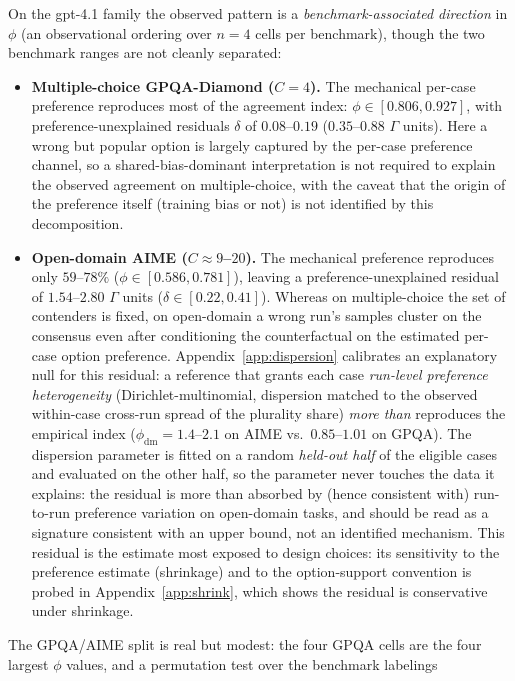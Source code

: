\documentclass{article}
\newcommand{\agreementIndex}{\Gamma}
\begin{document}
On the gpt-4.1 family the observed pattern is a
\emph{benchmark-associated direction} in
$\phi$ (an observational ordering over $n=4$ cells per benchmark),
though the two benchmark ranges are not cleanly separated:
\begin{itemize}
\item \textbf{Multiple-choice GPQA-Diamond ($C=4$).} The mechanical
  per-case preference reproduces most of the agreement index:
  $\phi\in[0.806,0.927]$, with preference-unexplained residuals $\delta$ of
  $0.08$--$0.19$ ($0.35$--$0.88$ $\agreementIndex$ units). Here a wrong but popular
  option is largely captured by the
  per-case preference channel, so a shared-bias-dominant interpretation
  is not required to explain the observed agreement on
  multiple-choice, with the
  caveat that the origin of the preference itself (training bias or not)
  is not identified by this decomposition.
\item \textbf{Open-domain AIME ($C\approx9$--$20$).} The mechanical
  preference reproduces only $59$--$78\%$
  ($\phi\in[0.586,0.781]$), leaving a preference-unexplained residual of
  $1.54$--$2.80$ $\agreementIndex$ units ($\delta\in[0.22,0.41]$). Whereas on
  multiple-choice the set of contenders is fixed, on open-domain
  a wrong run's samples cluster on the consensus even after
  conditioning the counterfactual on the estimated per-case option preference. Appendix~\ref{app:dispersion}
  calibrates an explanatory null for this residual: a reference that grants
  each case \emph{run-level preference heterogeneity}
  (Dirichlet-multinomial, dispersion matched to the observed
  within-case cross-run spread of the plurality share) \emph{more than}
  reproduces the empirical index ($\phi_{\mathrm{dm}}=1.4$--$2.1$ on
  AIME vs.\ $0.85$--$1.01$ on GPQA). The dispersion parameter is fitted on a random \emph{held-out half} of the eligible cases and evaluated on the other half, so the parameter never touches the data it explains: the residual is more than absorbed by (hence consistent with)
  run-to-run preference variation
  on open-domain tasks, and should be read as a
  signature consistent with an upper bound, not an identified mechanism. This
  residual is the estimate most exposed to design choices: its
  sensitivity to the preference estimate (shrinkage) and to the
  option-support convention is probed in
  Appendix~\ref{app:shrink}, which shows the residual is conservative
  under shrinkage.
\end{itemize}
The GPQA/AIME split is real but modest: the four GPQA cells are the four
largest $\phi$ values, and a permutation test over the benchmark labelings
\end{document}
